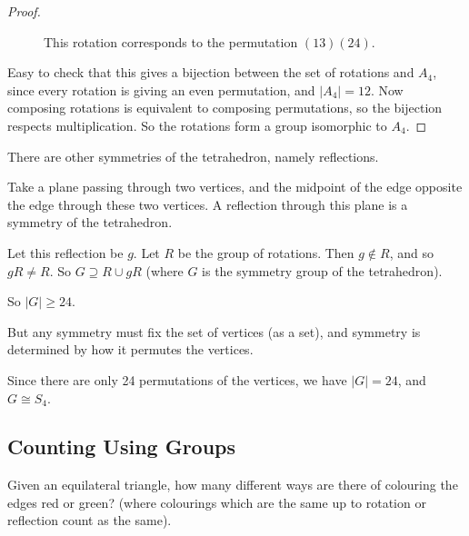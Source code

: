 \documentclass{article}
\theoremstyle{definition} \newtheorem*{definition}{Definition}
\newcommand{\ism}{\cong} \newcommand{\elemt}[2]{#1_{{#2}\sigma(#2)}}
\begin{document}
\begin{proof}
\begin{figure}[!tbp]
\begin{minipage}[b]{0.4\textwidth}
 \end{minipage} \hfill
      \begin{minipage}[b]{0.4\textwidth} \label{fig:lookingdownedge} \centering
      \end{minipage} \label{fig:lookingdownedge} \caption{This rotation
      corresponds to the permutation $(13)(24)$.} \end{figure} Easy to check
    that this gives a bijection between the set of rotations and $A_4$, since
    every rotation is giving an even permutation, and $|A_4|=12$.  Now
    composing rotations is equivalent to composing permutations, so the
    bijection respects multiplication. So the rotations form a group isomorphic
    to $A_4$.  \end{proof}

  There are other symmetries of the tetrahedron, namely reflections.

  Take a plane passing through two vertices, and the midpoint of the edge
  opposite the edge through these two vertices. A reflection through this plane
  is a symmetry of the tetrahedron. 

  Let this reflection be $g$. Let $R$ be the group of rotations. Then $g
  \not\in R$, and so $gR \neq R$. So $G \supseteq R \cup gR$ (where $G$ is the
  symmetry group of the tetrahedron). 

  So $|G| \geq 24$.

  But any symmetry must fix the set of vertices (as a set), and symmetry is
  determined by how it permutes the vertices.

  Since there are only 24 permutations of the vertices, we have $|G|=24$, and
  $G \ism S_4$.  \newpage \subsection{Counting Using Groups} Given an equilateral
  triangle, how many different ways are there of colouring the edges red or
  green? (where colourings which are the same up to rotation or reflection
  count as the same). 
\end{document}
